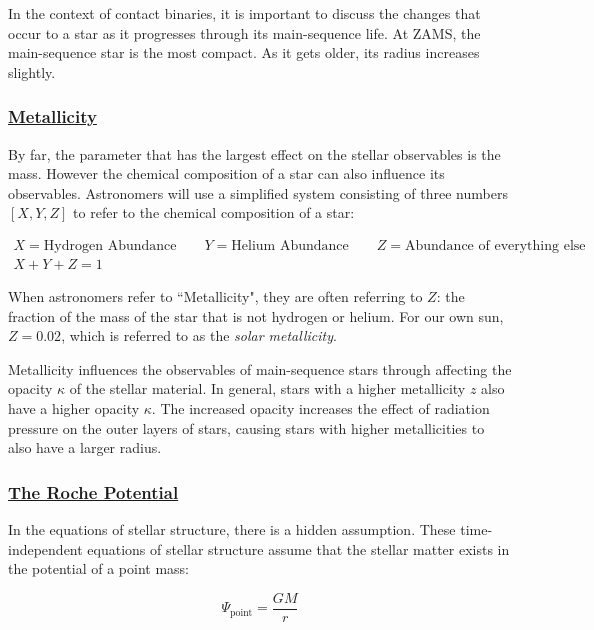 \documentclass[12pt]{article} %
\numberwithin{equation}{section} %
\begin{document}
In the context of contact binaries, it is important to discuss the changes that occur to a star as it progresses through its main-sequence life. At ZAMS, the main-sequence star is the most compact. As it gets older, its radius increases slightly.

\subsubsection[Metallicity]{\hyperlink{toc}{Metallicity}} \label{sec: Metallicity}

By far, the parameter that has the largest effect on the stellar observables is the mass. However the chemical composition of a star can also influence its observables. Astronomers will use a simplified system consisting of three numbers $[X,Y,Z]$ to refer to the chemical composition of a star:

\begin{multline} \label{def_metallicity}
X = \text{Hydrogen Abundance} \qquad Y = \text{Helium Abundance} \qquad Z = \text{Abundance of everything else} \\
X + Y + Z = 1
\end{multline}

When astronomers refer to ``Metallicity", they are often referring to $Z$: the fraction of the mass of the star that is not hydrogen or helium. For our own sun, $Z = 0.02$, which is referred to as the \emph{solar metallicity}.

Metallicity influences the observables of main-sequence stars through affecting the opacity $\kappa$ of the stellar material. In general, stars with a higher metallicity $z$ also have a higher opacity $\kappa$. The increased opacity increases the effect of radiation pressure on the outer layers of stars, causing stars with higher metallicities to also have a larger radius.

\subsubsection[The Roche Potential]{\hyperlink{toc}{The Roche Potential}} \label{sec: The Roche Potential}

In the equations of stellar structure, there is a hidden assumption. These time-independent equations of stellar structure assume that the stellar matter exists in the potential of a point mass:

\begin{equation} \label{point_mass}
\Psi_{\text{point}} = \frac{GM}{r}
\end{equation}
\end{document}
